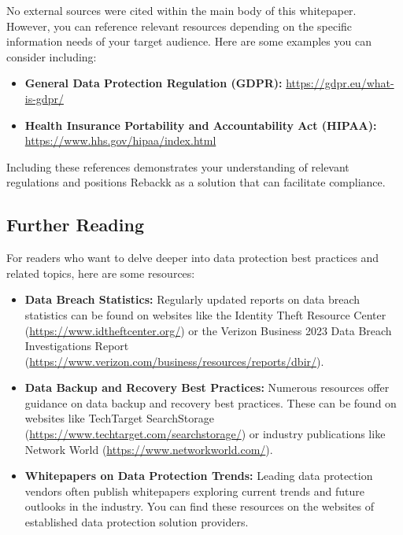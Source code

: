 \documentclass[12pt]{article}
\begin{document}
No external sources were cited within the main body of this whitepaper. However, you can reference relevant resources depending on the specific information needs of your target audience. Here are some examples you can consider including:

\begin{itemize}
    \item \textbf{General Data Protection Regulation (GDPR):} \url{https://gdpr.eu/what-is-gdpr/}
    \item \textbf{Health Insurance Portability and Accountability Act (HIPAA):} \url{https://www.hhs.gov/hipaa/index.html}
\end{itemize}

Including these references demonstrates your understanding of relevant regulations and positions Rebackk as a solution that can facilitate compliance.

\subsection*{Further Reading}

For readers who want to delve deeper into data protection best practices and related topics, here are some resources:

\begin{itemize}
    \item \textbf{Data Breach Statistics:} Regularly updated reports on data breach statistics can be found on websites like the Identity Theft Resource Center (\url{https://www.idtheftcenter.org/}) or the Verizon Business 2023 Data Breach Investigations Report (\url{https://www.verizon.com/business/resources/reports/dbir/}).
    \item \textbf{Data Backup and Recovery Best Practices:} Numerous resources offer guidance on data backup and recovery best practices. These can be found on websites like TechTarget SearchStorage (\url{https://www.techtarget.com/searchstorage/}) or industry publications like Network World (\url{https://www.networkworld.com/}).
    \item \textbf{Whitepapers on Data Protection Trends:} Leading data protection vendors often publish whitepapers exploring current trends and future outlooks in the industry. You can find these resources on the websites of established data protection solution providers.
\end{itemize}

\end{document}
